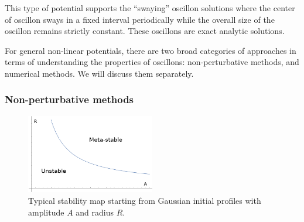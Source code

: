 \documentclass[11pt]{book}
\begin{document}
This type of potential supports the ``swaying'' oscillon solutions \cite{Arodz:2011zm} where the center of oscillon sways in a fixed interval periodically while the overall size of the oscillon remains strictly constant. These oscillons are exact analytic solutions.

\medbreak

For general non-linear potentials, there are two broad categories of approaches in terms of understanding the properties of oscillons: non-perturbative methods, and numerical methods. We will discuss them separately.

\subsubsection{Non-perturbative methods}\label{nonpert}
\begin{figure}\centering
  \includegraphics[width=0.5\textwidth]{plot/stability.png}
  \caption{Typical stability map starting from Gaussian initial profiles with amplitude $A$ and radius $R$.}
  \label{stability}
\end{figure}
\end{document}
